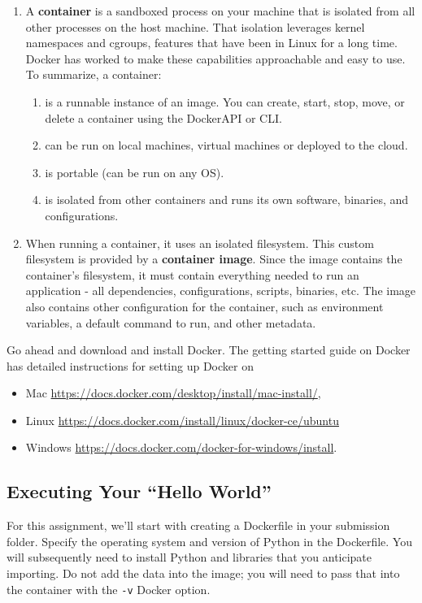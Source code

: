 \documentclass[paper=a4, fontsize=11pt]{scrartcl} %
\numberwithin{equation}{section} %
\numberwithin{figure}{section} %
\numberwithin{table}{section} %
\begin{document}
\begin{enumerate}
    \item A \textbf{container} is a sandboxed process on your machine that is isolated from all other processes on the host machine. That isolation leverages kernel namespaces and cgroups, features that have been in Linux for a long time. Docker has worked to make these capabilities approachable and easy to use. To summarize, a container:
    \begin{enumerate}
        \item is a runnable instance of an image. You can create, start, stop, move, or delete a container using the DockerAPI or CLI. 
        \item can be run on local machines, virtual machines or deployed to the cloud.
        \item is portable (can be run on any OS).
        \item is isolated from other containers and runs its own software, binaries, and configurations.
    \end{enumerate}

    \item When running a container, it uses an isolated filesystem. This custom filesystem is provided by a \textbf{container image}. Since the image contains the container’s filesystem, it must contain everything needed to run an application - all dependencies, configurations, scripts, binaries, etc. The image also contains other configuration for the container, such as environment variables, a default command to run, and other metadata.
\end{enumerate}

Go ahead and download and install Docker. The getting started guide on Docker has detailed instructions for setting up Docker on 
\begin{itemize}
    \item Mac \url{https://docs.docker.com/desktop/install/mac-install/},
    \item Linux \url{https://docs.docker.com/install/linux/docker-ce/ubuntu}
    \item Windows \url{https://docs.docker.com/docker-for-windows/install}.
\end{itemize}

\subsection{Executing Your ``Hello World''}

For this assignment, we'll start with creating a Dockerfile in your submission folder. Specify the operating system and version of Python in the Dockerfile. You will subsequently need to install Python and libraries that you anticipate importing. Do not add the data into the image; you will need to pass that into the container with the \verb"-v" Docker option.
\end{document}

